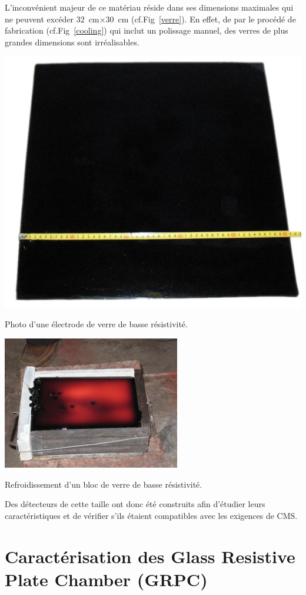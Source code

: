 L'inconvénient majeur de ce matériau réside dans ses dimensions maximales qui ne peuvent excéder \SI{32}{\centi\meter}$\times$\SI{30}{\centi\meter} (cf.Fig~\ref{verre}). En effet, de par le procédé de fabrication (cf.Fig~\ref{cooling}) qui inclut un polissage manuel, des verres de plus grandes dimensions sont irréalisables.
\marginpar
{
	\centering
	\includegraphics[width=\marginparwidth]{GLA/verre.png}
	\captionsetup{type=figure}\caption{Photo d'une électrode de verre de basse résistivité.}
	\label{verre}
}
\marginpar
{
	\centering
	\includegraphics[width=\marginparwidth]{GLA/cooling.png}
	\captionsetup{type=figure}\caption{Refroidissement d'un bloc de verre de basse résistivité.}
	\label{cooling}
}

Des détecteurs de cette taille ont donc été construits afin d'étudier leurs caractéristiques et de vérifier s'ils étaient compatibles avec les exigences de CMS.

\section{Caractérisation des Glass Resistive Plate Chamber (GRPC)}
 
